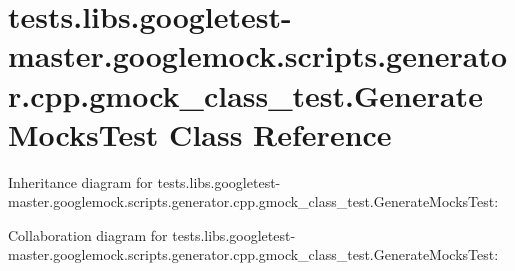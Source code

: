 \hypertarget{classtests_1_1libs_1_1googletest-master_1_1googlemock_1_1scripts_1_1generator_1_1cpp_1_1gmock__class__test_1_1GenerateMocksTest}{}\section{tests.\+libs.\+googletest-\/master.googlemock.\+scripts.\+generator.\+cpp.\+gmock\+\_\+class\+\_\+test.\+Generate\+Mocks\+Test Class Reference}
\label{classtests_1_1libs_1_1googletest-master_1_1googlemock_1_1scripts_1_1generator_1_1cpp_1_1gmock__class__test_1_1GenerateMocksTest}


Inheritance diagram for tests.\+libs.\+googletest-\/master.googlemock.\+scripts.\+generator.\+cpp.\+gmock\+\_\+class\+\_\+test.\+Generate\+Mocks\+Test\+:


Collaboration diagram for tests.\+libs.\+googletest-\/master.googlemock.\+scripts.\+generator.\+cpp.\+gmock\+\_\+class\+\_\+test.\+Generate\+Mocks\+Test\+:
